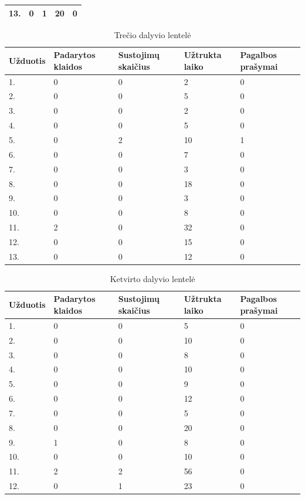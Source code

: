 \documentclass[oneside]{VUMIFPSkursinis}
\begin{document}
\begin{center}
\begin{table}[!pht]
\begin{tabular}{ |p{1.8cm} | p{3.4cm} | p{3.4cm} | p{2.5cm} | p{3.5cm}|}
13.&0&1&20&0 \\ \hline
\end{tabular}
\end{table}
\vspace{0.7cm}
	\begin{table}[!pht]
	\caption{Trečio dalyvio lentelė}
	\begin{tabular}{ |p{1.8cm} | p{3.4cm} | p{3.4cm} | p{2.5cm} | p{3.5cm}|}
	\hline
	Užduotis&Padarytos klaidos&Sustojimų skaičius&Užtrukta laiko&Pagalbos prašymai\\ \hline
1.&0&0&2&0 \\ \hline
2.&0&0&5&0 \\ \hline
3.&0&0&2&0 \\ \hline
4.&0&0&5&0 \\ \hline
5.&0&2&10&1 \\ \hline
6.&0&0&7&0 \\ \hline
7.&0&0&3&0 \\ \hline
8.&0&0&18&0 \\ \hline
9.&0&0&3&0 \\ \hline
10.&0&0&8&0 \\ \hline
11.&2&0&32&0 \\ \hline
12.&0&0&15&0 \\ \hline
13.&0&0&12&0 \\ \hline
\end{tabular}
\end{table}
\vspace{0.7cm}
	\begin{table}[!pht]
	\caption{Ketvirto dalyvio lentelė}
	\begin{tabular}{ |p{1.8cm} | p{3.4cm} | p{3.4cm} | p{2.5cm} | p{3.5cm}|}
	\hline
	Užduotis&Padarytos klaidos&Sustojimų skaičius&Užtrukta laiko&Pagalbos prašymai\\ \hline
1.&0&0&5&0 \\ \hline
2.&0&0&10&0 \\ \hline
3.&0&0&8&0 \\ \hline
4.&0&0&10&0 \\ \hline
5.&0&0&9&0 \\ \hline
6.&0&0&12&0 \\ \hline
7.&0&0&5&0 \\ \hline
8.&0&0&20&0 \\ \hline
9.&1&0&8&0 \\ \hline
10.&0&0&10&0 \\ \hline
11.&2&2&56&0 \\ \hline
12.&0&1&23&0 \\ \hline

\end{tabular}
\end{table}
\end{center}
\end{document}
